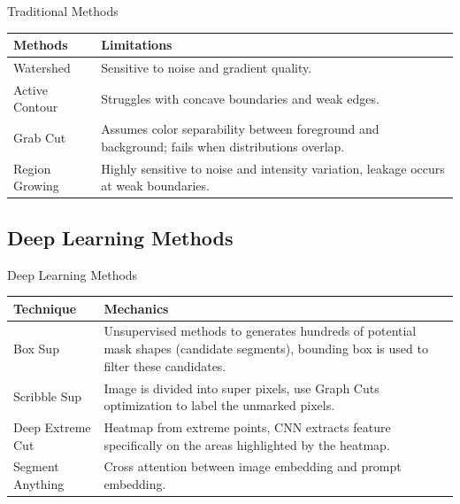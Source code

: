 \documentclass[11pt, aspectratio=169]{beamer}
\begin{document}
\begin{frame}{Traditional Methods} %
	\begin{table}[h]
		\centering
		\begin{tabular}{|l|p{10cm}|}
			\hline
			\textbf{Methods} & \textbf{Limitations} \\ \hline
			Watershed & Sensitive to noise and gradient quality. \\ \hline
			
			Active Contour & Struggles with concave boundaries and weak edges. \\ \hline
			
			Grab Cut & Assumes color separability between foreground and background; fails when distributions overlap. \\ \hline
			
			Region Growing & Highly sensitive to noise and intensity variation, leakage occurs at weak boundaries. \\ \hline
			
		\end{tabular}
	\end{table}
\end{frame}

\subsection{Deep Learning Methods}

\begin{frame}{Deep Learning Methods} %
	\begin{table}[h]
		\centering
		\begin{tabular}{|l|p{10cm}|}
			\hline
			\textbf{Technique} & \textbf{Mechanics} \\ \hline
			
			Box Sup
			& Unsupervised methods to generates hundreds of potential mask shapes (candidate segments), bounding box is used to filter these candidates. \\ \hline
			
			Scribble Sup
			& Image is divided into super pixels, use Graph Cuts optimization to label the unmarked pixels. \\ \hline
			
			Deep Extreme Cut
			& Heatmap from extreme points, CNN extracts feature specifically on the areas highlighted by the heatmap. \\ \hline

			Segment Anything
			& Cross attention between image embedding and prompt embedding. \\ \hline			
		\end{tabular}
	\end{table}
\end{frame}
\end{document}
